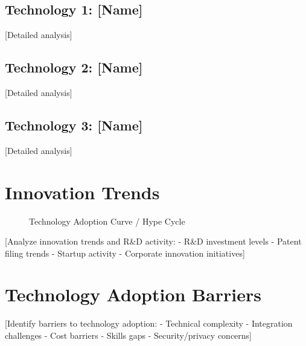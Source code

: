 \documentclass[11pt,letterpaper]{report}
\begin{document}
\subsection{Technology 1: [Name]}
[Detailed analysis]

\subsection{Technology 2: [Name]}
[Detailed analysis]

\subsection{Technology 3: [Name]}
[Detailed analysis]

\section{Innovation Trends}


\begin{figure}[htbp]
\centering
\caption{Technology Adoption Curve / Hype Cycle}
\label{fig:innovation}
\end{figure}

[Analyze innovation trends and R\&D activity:
- R\&D investment levels
- Patent filing trends
- Startup activity
- Corporate innovation initiatives]

\section{Technology Adoption Barriers}

[Identify barriers to technology adoption:
- Technical complexity
- Integration challenges
- Cost barriers
- Skills gaps
- Security/privacy concerns]

\end{document}
